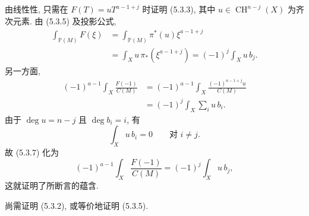 由线性性, 只需在 $F(T)=uT^{a-1+j}$ 时证明 (5.3.3), 其中 $u\in\operatorname{CH}^{n-j}(X)$ 为齐次元素. 由 (5.3.5) 及投影公式,
\begin{equation}\tag{5.3.6}
\begin{aligned}
\int_{\mathbb P(M)}F(\xi)
&=\int_{\mathbb P(M)}\pi^*(u)\xi^{a-1+j}\\
&=\int_Xu\,\pi_*(\xi^{a-1+j})
=(-1)^j\int_Xu\,b_j.
\end{aligned}
\end{equation}
另一方面,
\begin{equation}\tag{5.3.7}
\begin{aligned}
(-1)^{a-1}\int_X\frac{F(-1)}{C(M)}
&=(-1)^{a-1}\int_X
  \frac{(-1)^{a-1+j}u}{C(M)}\\
&=(-1)^j\int_X\sum_i u\,b_i.
\end{aligned}
\end{equation}
由于 $\deg u=n-j$ 且 $\deg b_i=i$, 有
\[
\int_Xu\,b_i=0\qquad\text{对 }i\ne j.
\]
故 (5.3.7) 化为
\begin{equation}\tag{5.3.8}
(-1)^{a-1}\int_X\frac{F(-1)}{C(M)}
=(-1)^j\int_Xu\,b_j,
\end{equation}
这就证明了所断言的蕴含.

尚需证明 (5.3.2), 或等价地证明 (5.3.5).

